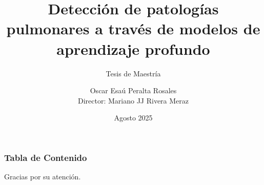 \documentclass{beamer}
\title[Detección de patologías pulmonares]{Detección de patologías pulmonares a través de modelos de aprendizaje profundo}
\subtitle{Tesis de Maestría}
\author[Oscar Esaú Peralta Rosales]{Oscar Esaú Peralta Rosales\\Director: Mariano JJ Rivera Meraz}
\institute[CIMAT]{Centro de Investigación en Matemáticas A.C.}
\date{Agosto 2025}
\begin{document}
\frame{\titlepage}

\begin{frame}
\frametitle{Tabla de Contenido}
\tableofcontents
\end{frame}




















% 

\begin{frame}
\begin{center}
    Gracias por su atención.
\end{center}
\end{frame}
\end{document}
